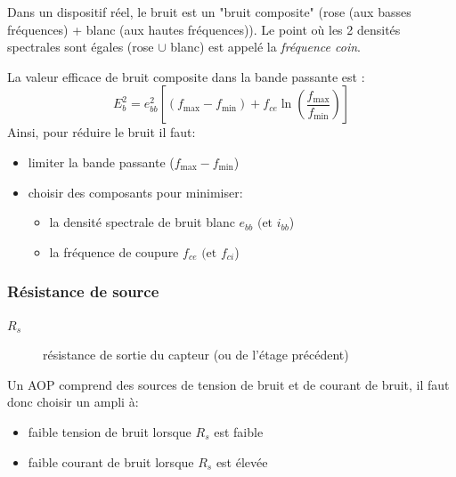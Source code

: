 Dans un dispositif réel, le bruit est un "bruit composite" (rose (aux basses fréquences) + blanc (aux hautes fréquences)). Le point où les 2 densités spectrales sont égales (rose \(\cup\) blanc) est appelé la \emph{fréquence coin}.
\begin{figure}[H]
	\centering
\end{figure}
La valeur efficace de bruit composite dans la bande passante est :
\begin{equation}
E_b^2 = e_{bb}^2\left[(f_{\text{max}}-f_{\text{min}})+f_{ce}\ln\left(\frac{f_{\text{max}}}{f_{\text{min}}}\right)\right]
\end{equation}
Ainsi, pour réduire le bruit il faut:
\begin{itemize}
	\item limiter la bande passante (\(f_{\text{max}}-f_{\text{min}}\))
	\item choisir des composants pour minimiser:
	\begin{itemize}
		\item la densité spectrale de bruit blanc \(e_{bb}\text{ (et }i_{bb}\))
		\item la fréquence de coupure \(f_{ce}\text{ (et }f_{ci}\))
	\end{itemize}
\end{itemize}
\subsubsection{Résistance de source} \label{subsubsec:résistsource}
\begin{description}
	\item[\(R_s\)] résistance de sortie du capteur (ou de l'étage précédent)
\end{description}
Un AOP comprend des sources de tension de bruit et de courant de bruit, il faut donc choisir un ampli à:
\begin{itemize}
	\item faible tension de bruit lorsque \(R_s\) est faible
	\item faible courant de bruit lorsque \(R_s\) est élevée
\end{itemize}

